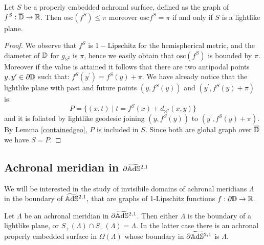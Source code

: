 \begin{lemma}\label{417}
    Let $S$ be a properly embedded achronal surface, defined as the graph of $f^S:\overline{\mathbb{D}}\to\mathbb{R}$. Then $\text{osc}(f^S)\leq\pi$ moreover $\text{osc}f^S=\pi$ if and only if $S$ is a lightlike plane. 
\end{lemma}
\begin{proof}
    We observe that $f^S$ is $1-$Lipschitz for the hemispherical metric, and the diameter of $\mathbb{D}$ for $g_{\mathbb{S}^2}$ is $\pi$, hence we easily obtain that $\text{osc}(f^S)$ is bounded by $\pi$. Moreover if the value is attained it follows that there are two antipodal points $y,y^{\prime} \in \partial\mathbb{D}$ such that: $f^S(y^{\prime})=f^S(y)+\pi$. We have already notice that the lightlike plane with past and future points $(y,f^S(y))$ and $(y^{\prime},f^S(y)+\pi)$ is: 
    \[
        P=\{(x,t)\;|\;t=f^S(x)+d_{\mathbb{S}^2}(x,y)\}
    \]
    and it is foliated by lightlike geodesic joining $(y,f^S(y))$ to $(y^{\prime},f^S(y)+\pi)$. By Lemma \ref{containedgeo}, $P$ is included in $S$. Since both are global graph over $\overline{\mathbb{D}}$ we have $S=P$.
\end{proof}

\subsection{Achronal meridian in $\partial\widetilde{\mathbb{A}\mathrm{d}\mathbb{S}}{}^{2,1}$}
We will be interested in the study of invisibile domains of achronal meridians $\Lambda$ in the boundary of $\widetilde{\mathbb{A}\mathrm{d}\mathbb{S}}{}^{2,1},$ that are graphs of 1-Lipschitz functions $f:\partial\mathbb{D}\to\mathbb{R}.$

\begin{lemma}\label{431}
    Let $\Lambda$ be an achronal meridian in $\partial\widetilde{\mathbb{A}\mathrm{d}\mathbb{S}}{}^{2,1}$. Then either $\Lambda$ is the boundary of a lightlike plane, or $S_+(\Lambda)\cap S_-(\Lambda)=\Lambda.$ In the latter case there is an achronal properly embedded surface in $\Omega(\Lambda)$ whose boundary in $\partial\widetilde{\mathbb{A}\mathrm{d}\mathbb{S}}{}^{2,1}$ is $\Lambda$.  
\end{lemma}

